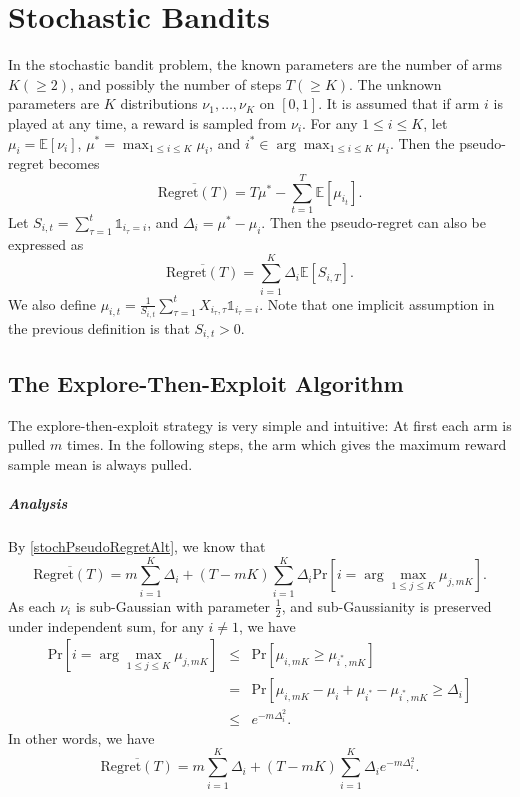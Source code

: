 \documentclass[openany]{book}
\theoremstyle{definition}
\theoremstyle{remark}
\begin{document}
\chapter{Stochastic Bandits}
In the stochastic bandit problem, the known parameters are the number of arms $K(\ge2)$, and possibly the number of steps $T(\ge K)$. The unknown parameters are $K$ distributions $\nu_1,\ldots,\nu_K$ on $[0,1]$. It is assumed that if arm $i$ is played at any time, a reward is sampled from $\nu_i$. For any $1\le i\le K$, let $\mu_i=\mathbb{E}[\nu_i]$, $\mu^*=\max_{1\le i\le K}\mu_i$, and $i^*\in\arg\max_{1\le i\le K}\mu_i$. Then the pseudo-regret becomes
\begin{equation}\label{stochPseudoRegret}
    \overline{\mathrm{Regret}(T)}=T\mu^*-\sum_{t=1}^{T}\mathbb{E}[\mu_{i_t}].
\end{equation}
Let $S_{i,t}=\sum_{\tau=1}^{t}\mathds{1}_{i_{\tau}=i}$, and $\Delta_i=\mu^*-\mu_i$. Then the pseudo-regret can also be expressed as
\begin{equation}\label{stochPseudoRegretAlt}
    \overline{\mathrm{Regret}(T)}=\sum_{i=1}^{K}\Delta_i \mathbb{E}[S_{i,T}].
\end{equation}
We also define $\mu_{i,t}=\frac{1}{S_{i,t}}\sum_{\tau=1}^{t}X_{i_{\tau},\tau}\mathds{1}_{i_{\tau}=i}$. Note that one implicit assumption in the previous definition is that $S_{i,t}>0$.

\section{The Explore-Then-Exploit Algorithm}
The explore-then-exploit strategy is very simple and intuitive: At first each arm is pulled $m$ times. In the following steps, the arm which gives the maximum reward sample mean is always pulled.

\paragraph{Analysis}
By \eqref{stochPseudoRegretAlt}, we know that
\begin{equation}
    \overline{\mathrm{Regret}(T)}=m \sum_{i=1}^{K}\Delta_i+(T-mK)\sum_{i=1}^{K}\Delta_i \mathrm{Pr}[i=\arg\max_{1\le j\le K}\mu_{j,mK}].
\end{equation}
As each $\nu_i$ is sub-Gaussian with parameter $\frac{1}{2}$, and sub-Gaussianity is preserved under independent sum, for any $i\ne1$, we have
\begin{equation}
    \begin{array}{rcl}
        \displaystyle\mathrm{Pr}[i=\arg\max_{1\le j\le K}\mu_{j,mK}] & \le & \mathrm{Pr}[\mu_{i,mK}\ge\mu_{i^*,mK}] \\
         & = & \mathrm{Pr}[\mu_{i,mK}-\mu_i+\mu_{i^*}-\mu_{i^*,mK}\ge\Delta_i] \\
         & \le & e^{-m\Delta_i^2}.
    \end{array}
\end{equation}
In other words, we have
\begin{equation}\label{exploreThenExploitBound}
    \overline{\mathrm{Regret}(T)}=m \sum_{i=1}^{K}\Delta_i+(T-mK)\sum_{i=1}^{K}\Delta_ie^{-m\Delta_i^2}.
\end{equation}
\end{document}
